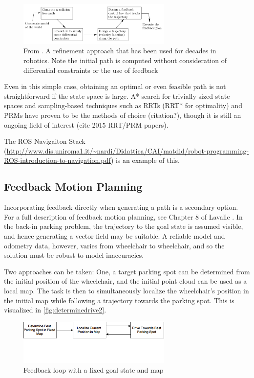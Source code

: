 \begin{figure}
\centering
\includegraphics[width=3in]{figures/lavalle2006planning119.png}
\caption{From \cite{lavalle2006planning}. A refinement approach that has been
used for decades in robotics. Note the initial path is computed without
consideration of differential constraints or the use of feedback}
\label{fig:lavalle2006planning119}
\end{figure}

Even in this simple case, obtaining an optimal or even feasible path is not
straightforward if the state space is large. A* search for trivially sized state
spaces and sampling-based techniques such as RRTs (RRT* for optimality) and PRMs
have proven to be the methods of choice (citation?), though it is still an
ongoing field of interest (cite 2015 RRT/PRM papers).

The ROS Navigaiton Stack
(\url{http://www.dis.uniroma1.it/~nardi/Didattica/CAI/matdid/robot-programming-ROS-introduction-to-navigation.pdf})
is an example of this.
\subsection{Feedback Motion Planning}
Incorporating feedback directly when generating a path is a secondary option. 
For a full description of feedback motion planning, see Chapter 8 of Lavalle
\cite{lavalle2006planning}.
In the back-in parking problem, the trajectory to the goal state is assumed
visible, and hence generating a vector field may be suitable. A reliable model
and odometry data, however, varies from wheelchair to wheelchair, and so the
solution must be robust to model inaccuracies.

Two approaches can be taken: One, a target parking spot can be determined from
the initial position of the wheelchair, and the initial point cloud can be used
as a local map. The task is then to simultaneously localize the wheelchair's
position in the initial map while following a trajectory towards the parking
spot. This is visualized in \autoref{fig:determinedrive2}.
 
\begin{figure} %
\centering
\includegraphics[width=3in]{figures/determinedrive2.png}
\caption{Feedback loop with a fixed goal state and map}
\label{fig:determinedrive2}
\end{figure}   %

